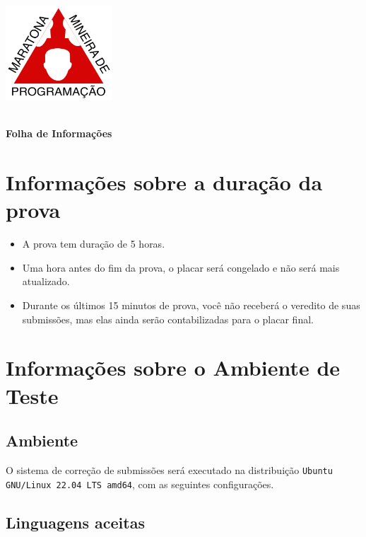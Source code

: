 \documentclass{article}
\begin{document}
\begin{titlepage}
\begin{center}

\includegraphics[width=4cm]{logo.png}

\vspace{1cm}
{\huge{\bf {}}} \\

\vspace{0.5cm}
{\huge \bf Folha de Informações}\\[12pt]
{\Large \bf {}}
\end{center}

\section{Informações sobre a duração da prova}

\begin{itemize}
	\item A prova tem duração de 5 horas.
	\item Uma hora antes do fim da prova, o placar será congelado e não será mais atualizado.
	\item Durante os últimos 15 minutos de prova, você não receberá o veredito de suas submissões, mas elas ainda serão contabilizadas para o placar final.
\end{itemize}

\section{Informações sobre o Ambiente de Teste}

\subsection{Ambiente}

O sistema de correção de submissões será executado na distribuição \texttt{Ubuntu GNU/Linux 22.04 LTS amd64}, com as seguintes configurações.

\subsection{Linguagens aceitas}


\end{titlepage}
\end{document}
